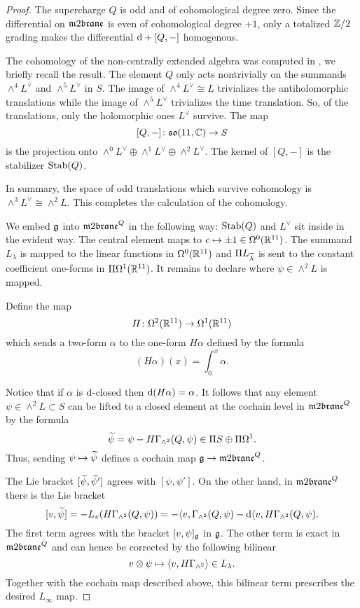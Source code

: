 \begin{proof}
The supercharge $Q$ is odd and of cohomological degree zero.
Since the differential on $\m2$ is even of cohomological degree $+1$, only a totalized $\ZZ/2$ grading makes the differential $\d + [Q,-]$ homogenous. 

The cohomology of the non-centrally extended algebra was computed in \cite{SWspinor}, we briefly recall the result. 
The element $Q$ only acts nontrivially on the summands $\wedge^4 L^\vee$ and $\wedge^5 L^\vee$ in $S$. 
The image of $\wedge^4 L^\vee \cong L$ trivializes the antiholomorphic translations while the image of $\wedge^5 L^\vee$ trivializes the time translation.
So, of the translations, only the holomorphic ones $L^\vee$ survive.
The map 
\[
[Q,-] \colon \lie{so}(11,\CC) \to S 
\] 
is the projection onto $\wedge^0 L^\vee \oplus \wedge^1 L^\vee \oplus \wedge^2 L^\vee$. 
The kernel of $[Q,-]$ is the stabilizer ${\rm Stab}(Q)$.

In summary, the space of odd translations which survive cohomology is $\wedge^3 L^\vee \cong \wedge^2 L$.
This completes the calculation of the cohomology. 

We embed $\fg$ into $\m2^Q$ in the following way: ${\rm Stab}(Q)$ and $L^\vee$ sit inside in the evident way.
The central element maps to $c \mapsto \pm 1 \in \Omega^0(\RR^{11})$.
The summand $L_\lambda$ is mapped to the linear functions in $\Omega^0(\RR^{11})$ and $\Pi L_{\Tilde{\lambda}}$ is sent to the constant coefficient one-forms in $\Pi \Omega^1(\RR^{11})$. 
It remains to declare where $\psi \in \wedge^2 L$ is mapped.

Define the map
\[
H \colon \Omega^2 (\RR^{11}) \to \Omega^1(\RR^{11})
\]
which sends a two-form $\alpha$ to the one-form $H \alpha$ defined by the formula
\[
(H \alpha) (x) = \int_0^x \alpha .
\]

Notice that if $\alpha$ is $\d$-closed then $\d (H \alpha) = \alpha$. 
It follows that any element $\psi \in \wedge^2 L \subset S$ can be lifted to a closed element at the cochain level in $\m2^Q$ by the formula
\[
\Tilde{\psi} = \psi - H \Gamma_{\wedge^2} (Q, \psi) \in \Pi S \oplus \Pi \Omega^1 .
\]
Thus, sending $\psi \mapsto \Tilde{\psi}$ defines a cochain map $\fg \to \m2^Q$. 

The Lie bracket $[\Tilde{\psi}, \Tilde{\psi}']$ agrees with $[\psi, \psi']$. 
On the other hand, in $\m2^Q$ there is the Lie bracket 
\[
[v,\Tilde{\psi}] = - L_v (H \Gamma_{\wedge^2} (Q, \psi)) = -\<v, \Gamma_{\wedge^2}(Q, \psi) - \d \<v, H \Gamma_{\wedge^2}(Q, \psi) .
\]
The first term agrees with the bracket $[v, \psi]_{\fg}$ in $\fg$. 
The other term is exact in $\m2^Q$ and can hence be corrected by the following bilinear  
\[
v \otimes \psi \mapsto \<v, H \Gamma_{\wedge^2} \> \in L_\lambda .
\] 
Together with the cochain map described above, this bilinear term prescribes the desired $L_\infty$ map. 

\end{proof}

